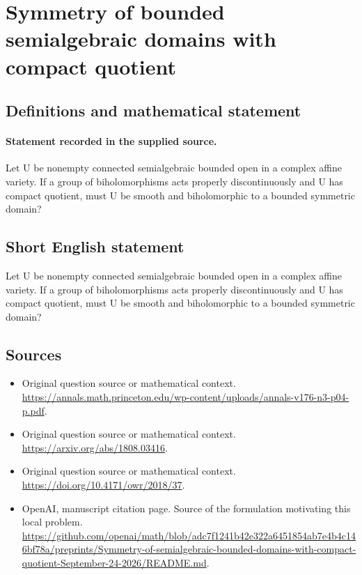 \documentclass[11pt]{article}
\begin{document}
\section*{Symmetry of bounded semialgebraic domains with compact quotient}\label{30007061}
\subsection{Definitions and mathematical statement}
\paragraph{Statement recorded in the supplied source.}
Let U be nonempty connected semialgebraic bounded open in a complex affine variety. If a group of biholomorphisms acts properly discontinuously and U has compact quotient, must U be smooth and biholomorphic to a bounded symmetric domain?
\subsection{Short English statement}
Let U be nonempty connected semialgebraic bounded open in a complex affine variety. If a group of biholomorphisms acts properly discontinuously and U has compact quotient, must U be smooth and biholomorphic to a bounded symmetric domain?
\subsection{Sources}
\begin{itemize}
\item[S1] Original question source or mathematical context.
\url{https://annals.math.princeton.edu/wp-content/uploads/annals-v176-n3-p04-p.pdf}.
\item[S2] Original question source or mathematical context.
\url{https://arxiv.org/abs/1808.03416}.
\item[S3] Original question source or mathematical context.
\url{https://doi.org/10.4171/owr/2018/37}.
\item[S4] OpenAI, manuscript citation page. Source of the formulation motivating this local problem.
\url{https://github.com/openai/math/blob/adc7f1241b42e322a6451854ab7e4b4c146bf78a/preprints/Symmetry-of-semialgebraic-bounded-domains-with-compact-quotient-September-24-2026/README.md}.
\end{itemize}
\end{document}
